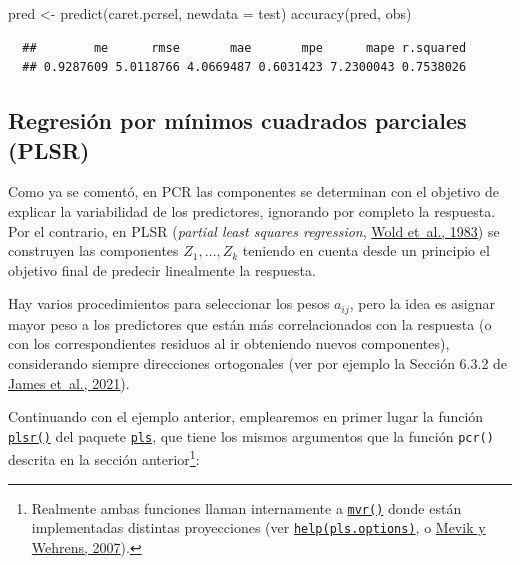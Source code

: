 \documentclass[
]{book}
\newenvironment{Shaded}{\begin{snugshade}}{\end{snugshade}}
\newcommand{\AttributeTok}[1]{\textcolor[rgb]{0.77,0.63,0.00}{#1}}
\newcommand{\FunctionTok}[1]{\textcolor[rgb]{0.00,0.00,0.00}{#1}}
\newcommand{\NormalTok}[1]{#1}
\newcommand{\OtherTok}[1]{\textcolor[rgb]{0.56,0.35,0.01}{#1}}
\theoremstyle{break}
\theoremstyle{nonumberplain}
\begin{document}
\begin{Shaded}
\begin{Highlighting}[]
\NormalTok{pred }\OtherTok{\textless{}{-}} \FunctionTok{predict}\NormalTok{(caret.pcrsel, }\AttributeTok{newdata =}\NormalTok{ test)}
\FunctionTok{accuracy}\NormalTok{(pred, obs)}
\end{Highlighting}
\end{Shaded}

\begin{verbatim}
  ##        me      rmse       mae       mpe      mape r.squared 
  ## 0.9287609 5.0118766 4.0669487 0.6031423 7.2300043 0.7538026
\end{verbatim}

\hypertarget{regresiuxf3n-por-muxednimos-cuadrados-parciales-plsr}{%
\subsection{Regresión por mínimos cuadrados parciales (PLSR)}\label{regresiuxf3n-por-muxednimos-cuadrados-parciales-plsr}}

Como ya se comentó, en PCR las componentes se determinan con el objetivo de explicar la variabilidad de los predictores, ignorando por completo la respuesta.
Por el contrario, en PLSR (\emph{partial least squares regression}, \protect\hyperlink{ref-wold1983multivariate}{Wold et~al., 1983}) se construyen las componentes \(Z_1, \ldots, Z_k\) teniendo en cuenta desde un principio el objetivo final de predecir linealmente la respuesta.

Hay varios procedimientos para seleccionar los pesos \(a_{ij}\), pero la idea es asignar mayor peso a los predictores que están más correlacionados con la respuesta (o con los correspondientes residuos al ir obteniendo nuevos componentes), considerando siempre direcciones ortogonales (ver por ejemplo la Sección 6.3.2 de \protect\hyperlink{ref-james2021introduction}{James et~al., 2021}).

Continuando con el ejemplo anterior, emplearemos en primer lugar la función \href{https://rdrr.io/pkg/pls/man/mvr.html}{\texttt{plsr()}} del paquete \href{https://mevik.net/work/software/pls.html}{\texttt{pls}}, que tiene los mismos argumentos que la función \texttt{pcr()} descrita en la sección anterior\footnote{Realmente ambas funciones llaman internamente a \href{https://rdrr.io/pkg/pls/man/mvr.html}{\texttt{mvr()}} donde están implementadas distintas proyecciones (ver \href{https://rdrr.io/pkg/pls/man/pls.options.html}{\texttt{help(pls.options)}}, o \protect\hyperlink{ref-Mevik2007pls}{Mevik y Wehrens, 2007}).}:
\end{document}
